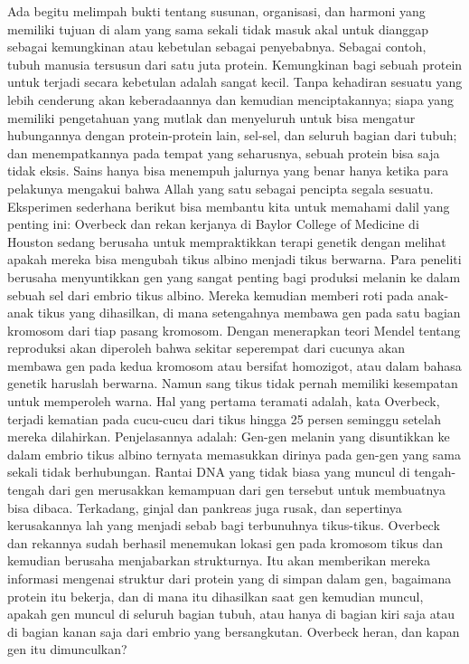 \documentclass[]{article}
\begin{document}
Ada begitu melimpah bukti tentang susunan, organisasi, dan harmoni yang memiliki tujuan di alam yang sama sekali tidak  masuk akal untuk dianggap sebagai kemungkinan atau kebetulan sebagai penyebabnya. Sebagai contoh, tubuh manusia tersusun dari satu juta protein. Kemungkinan bagi sebuah protein untuk terjadi secara kebetulan adalah sangat kecil. Tanpa kehadiran sesuatu yang lebih cenderung akan keberadaannya dan kemudian menciptakannya; siapa yang memiliki pengetahuan yang mutlak dan menyeluruh untuk bisa mengatur hubungannya dengan protein-protein lain, sel-sel, dan seluruh bagian dari tubuh; dan menempatkannya pada tempat yang seharusnya,  sebuah protein bisa saja tidak eksis. Sains hanya bisa menempuh jalurnya yang benar hanya ketika para pelakunya mengakui bahwa Allah yang satu sebagai pencipta segala sesuatu. 
Eksperimen sederhana berikut bisa membantu kita untuk memahami dalil yang penting ini: 
Overbeck dan rekan kerjanya di Baylor College of Medicine di Houston sedang berusaha untuk mempraktikkan terapi genetik dengan melihat apakah mereka bisa mengubah tikus albino menjadi tikus berwarna. Para peneliti berusaha menyuntikkan gen yang sangat penting bagi produksi melanin ke dalam sebuah sel dari embrio tikus albino. Mereka kemudian memberi roti pada anak-anak tikus yang dihasilkan, di mana setengahnya membawa gen pada satu bagian kromosom dari tiap pasang kromosom.  Dengan menerapkan teori Mendel tentang reproduksi akan diperoleh bahwa sekitar seperempat dari cucunya akan membawa gen pada kedua kromosom atau bersifat homozigot, atau dalam bahasa genetik haruslah berwarna. 
Namun sang tikus tidak pernah memiliki kesempatan untuk memperoleh warna.  Hal yang pertama teramati adalah, kata Overbeck, terjadi kematian pada cucu-cucu dari tikus hingga 25 persen seminggu setelah mereka dilahirkan. Penjelasannya adalah: 
Gen-gen melanin yang disuntikkan ke dalam embrio tikus albino ternyata memasukkan dirinya pada gen-gen yang sama sekali tidak berhubungan. Rantai DNA yang tidak biasa yang muncul di tengah-tengah dari gen merusakkan kemampuan dari gen tersebut untuk membuatnya bisa dibaca. Terkadang, ginjal dan pankreas juga rusak, dan sepertinya kerusakannya lah yang menjadi sebab bagi terbunuhnya tikus-tikus. 
Overbeck dan rekannya sudah berhasil menemukan lokasi gen pada kromosom tikus dan kemudian berusaha menjabarkan strukturnya. Itu akan memberikan mereka informasi mengenai struktur dari protein yang di simpan dalam gen,  bagaimana protein itu bekerja, dan di mana itu dihasilkan saat gen kemudian muncul, apakah gen muncul di seluruh bagian  tubuh, atau hanya di bagian kiri saja atau di bagian kanan saja dari embrio yang bersangkutan. Overbeck heran, dan kapan gen itu dimunculkan? 
\end{document}
